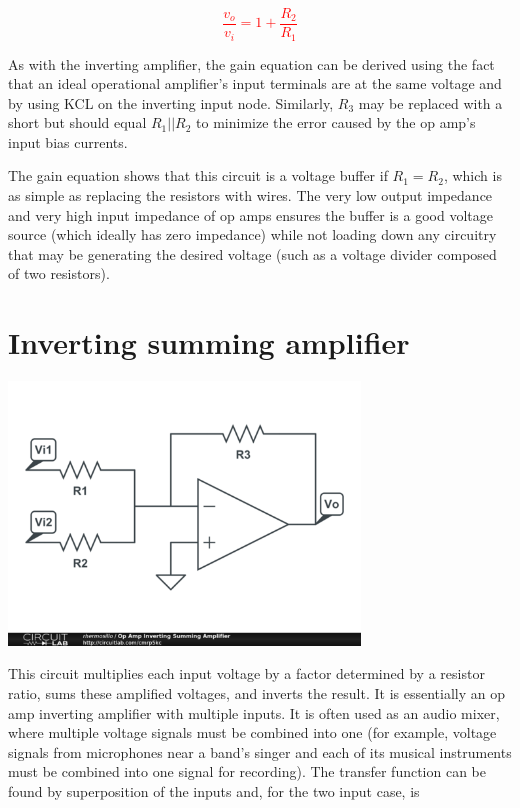 \textcolor{red}{
\begin{equation}
\frac{v_{o}}{v_{i}} = 1+\frac{R_{2}}{R_{1}}
\label{eq:noninvertingopampamplifier}
\end{equation}
}

As with the inverting amplifier, the gain equation can be derived using the fact that an ideal operational amplifier's input terminals are at the same voltage and by using KCL on the inverting input node. Similarly, $R_{3}$ may be replaced with a short but should equal $R_{1}||R_{2}$ to minimize the error caused by the op amp's input bias currents.
\par The gain equation shows that this circuit is a voltage buffer if $R_{1} = R_{2}$, which is as simple as replacing the resistors with wires. The very low output impedance and very high input impedance of op amps ensures the buffer is a good voltage source (which ideally has zero impedance) while not loading down any circuitry that may be generating the desired voltage (such as a voltage divider composed of two resistors).

\section{Inverting summing amplifier}
\begin{center}
	\includegraphics[width=0.70\textwidth]{schematics/invsummingamp.PNG}
\end{center}
\par This circuit multiplies each input voltage by a factor determined by a resistor ratio, sums these amplified voltages, and inverts the result. It is essentially an op amp inverting amplifier with multiple inputs. It is often used as an audio mixer, where multiple voltage signals must be combined into one (for example, voltage signals from microphones near a band's singer and each of its musical instruments must be combined into one signal for recording). The transfer function can be found by superposition of the inputs and, for the two input case, is

